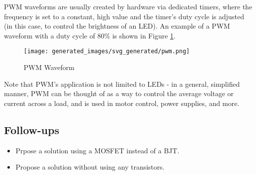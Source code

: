 \documentclass[main.tex]{subfiles}
\begin{document}
\newnoindentpara PWM waveforms are usually created by hardware via dedicated timers, where the frequency is set to a constant, high value and the timer's duty cycle is adjusted (in this case, to control the brightness of an LED). An example of a PWM waveform with a duty cycle of 80\% is shown in Figure \ref{fig:pwm_waveform}.

\begin{figure}[H]
    \centering
    \texttt{[image: generated\_images/svg\_generated/pwm.png]}
    \caption{PWM Waveform}
    \label{fig:pwm_waveform}
\end{figure}

\noindent Note that PWM's application is not limited to LEDs - in a general, simplified manner, PWM can be thought of as a way to control the average voltage or current across a load, and is used in motor control, power supplies, and more. 

\subsection{Follow-ups}
\begin{itemize}
    \item Prpose a solution using a MOSFET instead of a BJT.
    \item Propose a solution without using any transistors. 
\end{itemize}
\end{document}
